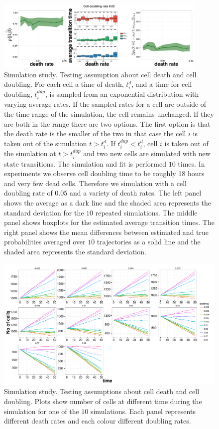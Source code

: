 \begin{figure}
  \centering
  \includegraphics[width=0.9\textwidth]{pics/realist-dupl.pdf}
  \caption{Simulation study. Testing assumption about cell death and cell doubling. For each cell a time of death, $t_i^{d}$, and a time for cell doubling, $t_i^{dup}$, is sampled from an exponential distribution with varying average rates. If the sampled rates for a cell are outside of the time range of the simulation, the cell remains unchanged. If they are both in the range there are two options. The first option is that the death rate is the smaller of the two in that case the cell $i$ is taken out of the simulation $t>t_i^d$. If $t_i^{dup}<t_i^d$, cell $i$ is taken out of the simulation at $t > t_i^{dup}$ and two new cells are simulated with new state transitions. The simulation and fit is performed $10$ times. In experiments we observe cell doubling time to be roughly 18 hours and very few dead cells. Therefore we simulation with a cell doubling rate of $0.05$ and a variety of death rates. The left panel shows the average as a dark line and the shaded area represents the standard deviation for the $10$ repeated simulations. The middle panel shows boxplots for the estimated average transition times. The right panel shows the mean differences between estimated and true probabilities averaged over $10$ trajectories as a solid line and the shaded area represents the standard deviation.}
  \label{fig:dupl-realistic}
\end{figure}

\begin{figure}
    \centering \includegraphics[width=1\textwidth]{pics/n-cell.pdf}
    \caption{Simulation study. Testing assumptions about cell death and cell doubling. Plots show number of cells at different time during the simulation for one of the $10$ simulations. Each panel represents different death rates and each colour different doubling rates.}
\label{fig:no-cells-dupl}
\end{figure}

